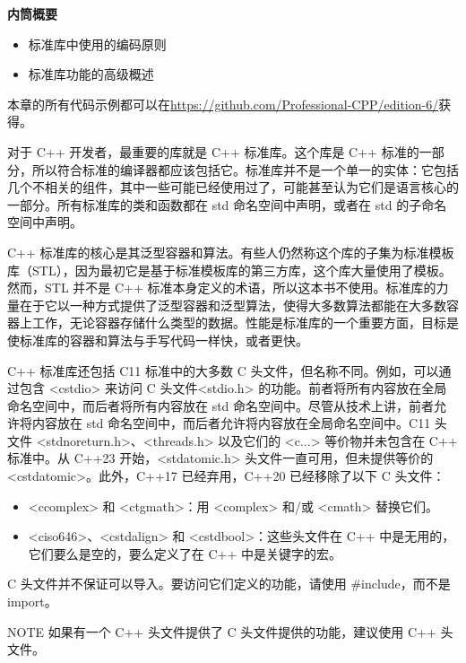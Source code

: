 \noindent
\textbf{内筒概要}

\begin{itemize}
\item
标准库中使用的编码原则

\item
标准库功能的高级概述
\end{itemize}

本章的所有代码示例都可以在\url{https://github.com/Professional-CPP/edition-6/}获得。

对于 C++ 开发者，最重要的库就是 C++ 标准库。这个库是 C++ 标准的一部分，所以符合标准的编译器都应该包括它。标准库并不是一个单一的实体：它包括几个不相关的组件，其中一些可能已经使用过了，可能甚至认为它们是语言核心的一部分。所有标准库的类和函数都在 std 命名空间中声明，或者在 std 的子命名空间中声明。

C++ 标准库的核心是其泛型容器和算法。有些人仍然称这个库的子集为标准模板库（STL），因为最初它是基于标准模板库的第三方库，这个库大量使用了模板。然而，STL 并不是 C++ 标准本身定义的术语，所以这本书不使用。标准库的力量在于它以一种方式提供了泛型容器和泛型算法，使得大多数算法都能在大多数容器上工作，无论容器存储什么类型的数据。性能是标准库的一个重要方面，目标是使标准库的容器和算法与手写代码一样快，或者更快。

C++ 标准库还包括 C11 标准中的大多数 C 头文件，但名称不同。例如，可以通过包含 <cstdio> 来访问 C 头文件<stdio.h> 的功能。前者将所有内容放在全局命名空间中，而后者将所有内容放在 std 命名空间中。尽管从技术上讲，前者允许将内容放在 std 命名空间中，而后者允许将内容放在全局命名空间中。C11 头文件 <stdnoreturn.h>、<threads.h> 以及它们的 <c...> 等价物并未包含在 C++ 标准中。从 C++23 开始，<stdatomic.h> 头文件一直可用，但未提供等价的 <cstdatomic>。此外，C++17 已经弃用，C++20 已经移除了以下 C 头文件：

\begin{itemize}
\item
<ccomplex> 和 <ctgmath>：用 <complex> 和/或 <cmath> 替换它们。

\item
<ciso646>、<cstdalign> 和 <cstdbool>：这些头文件在 C++ 中是无用的，它们要么是空的，要么定义了在 C++ 中是关键字的宏。
\end{itemize}

C 头文件并不保证可以导入。要访问它们定义的功能，请使用 \#include，而不是 import。

\begin{myNotic}{NOTE}
如果有一个 C++ 头文件提供了 C 头文件提供的功能，建议使用 C++ 头文件。
\end{myNotic}


